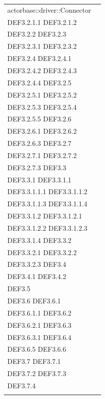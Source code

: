 \documentclass{scalatekids-article}
\begin{document}
\begin{longtable}[H]{|p{12cm}|p{5.5cm}|}
actorbase::driver::Connector & \multiLineCell[t]{DEF3.2 DEF3.2.1\\DEF3.2.1.1 DEF3.2.1.2\\DEF3.2.2 DEF3.2.3\\DEF3.2.3.1 DEF3.2.3.2\\DEF3.2.4 DEF3.2.4.1\\DEF3.2.4.2 DEF3.2.4.3\\DEF3.2.4.4 DEF3.2.5\\DEF3.2.5.1 DEF3.2.5.2\\DEF3.2.5.3 DEF3.2.5.4\\DEF3.2.5.5 DEF3.2.6\\DEF3.2.6.1 DEF3.2.6.2\\DEF3.2.6.3 DEF3.2.7\\DEF3.2.7.1 DEF3.2.7.2\\DEF3.2.7.3 DEF3.3\\DEF3.3.1 DEF3.3.1.1\\DEF3.3.1.1.1 DEF3.3.1.1.2\\DEF3.3.1.1.3 DEF3.3.1.1.4\\DEF3.3.1.2 DEF3.3.1.2.1\\DEF3.3.1.2.2 DEF3.3.1.2.3\\DEF3.3.1.4 DEF3.3.2\\DEF3.3.2.1 DEF3.3.2.2\\DEF3.3.2.3 DEF3.4\\DEF3.4.1 DEF3.4.2\\DEF3.5\\DEF3.6 DEF3.6.1\\DEF3.6.1.1 DEF3.6.2\\DEF3.6.2.1 DEF3.6.3\\DEF3.6.3.1 DEF3.6.4\\DEF3.6.5 DEF3.6.6\\DEF3.7 DEF3.7.1\\DEF3.7.2 DEF3.7.3\\DEF3.7.4\\}\\
\hline

\end{longtable}
\end{document}
